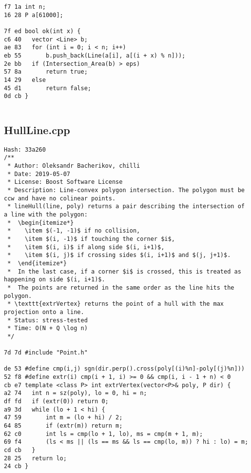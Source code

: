 \documentclass[11pt, a4paper, twoside]{article}
\begin{document}
\begin{lstlisting}
f7 1a int n;
16 28 P a[61000];
 
7f ed bool ok(int x) {
c6 40 	vector <Line> b;
ae 83 	for (int i = 0; i < n; i++)
eb 55 		b.push_back(Line(a[i], a[(i + x) % n]));
2e bb 	if (Intersection_Area(b) > eps)
57 8a 		return true;
14 29 	else
45 d1 		return false;
0d cb }
 
\end{lstlisting}

\subsection{HullLine.cpp}
\begin{lstlisting}
Hash: 33a260
/**
 * Author: Oleksandr Bacherikov, chilli
 * Date: 2019-05-07
 * License: Boost Software License
 * Description: Line-convex polygon intersection. The polygon must be ccw and have no colinear points.
 * lineHull(line, poly) returns a pair describing the intersection of a line with the polygon:
 *  \begin{itemize*}
 *    \item $(-1, -1)$ if no collision,
 *    \item $(i, -1)$ if touching the corner $i$,
 *    \item $(i, i)$ if along side $(i, i+1)$,
 *    \item $(i, j)$ if crossing sides $(i, i+1)$ and $(j, j+1)$.
 *  \end{itemize*}
 *  In the last case, if a corner $i$ is crossed, this is treated as happening on side $(i, i+1)$.
 *  The points are returned in the same order as the line hits the polygon.
 * \texttt{extrVertex} returns the point of a hull with the max projection onto a line.
 * Status: stress-tested
 * Time: O(N + Q \log n)
 */

7d 7d #include "Point.h"

de 53 #define cmp(i,j) sgn(dir.perp().cross(poly[(i)%n]-poly[(j)%n]))
52 f8 #define extr(i) cmp(i + 1, i) >= 0 && cmp(i, i - 1 + n) < 0
cb e7 template <class P> int extrVertex(vector<P>& poly, P dir) {
a2 74 	int n = sz(poly), lo = 0, hi = n;
df fd 	if (extr(0)) return 0;
a9 3d 	while (lo + 1 < hi) {
47 59 		int m = (lo + hi) / 2;
64 85 		if (extr(m)) return m;
62 c0 		int ls = cmp(lo + 1, lo), ms = cmp(m + 1, m);
69 f4 		(ls < ms || (ls == ms && ls == cmp(lo, m)) ? hi : lo) = m;
cd cb 	}
28 25 	return lo;
24 cb }


\end{lstlisting}
\end{document}
